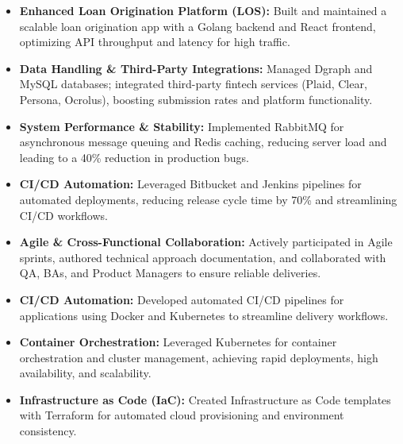 \begin{itemize}
  \item \textbf{Enhanced Loan Origination Platform (LOS):} Built and maintained a scalable loan origination app with a Golang backend and React frontend, optimizing API throughput and latency for high traffic.
  \item \textbf{Data Handling \& Third-Party Integrations:} Managed Dgraph and MySQL databases; integrated third-party fintech services (Plaid, Clear, Persona, Ocrolus), boosting submission rates and platform functionality.
  \item \textbf{System Performance \& Stability:} Implemented RabbitMQ for asynchronous message queuing and Redis caching, reducing server load and leading to a 40\% reduction in production bugs.
  \item \textbf{CI/CD Automation:} Leveraged Bitbucket and Jenkins pipelines for automated deployments, reducing release cycle time by 70\% and streamlining CI/CD workflows.
  \item \textbf{Agile \& Cross-Functional Collaboration:} Actively participated in Agile sprints, authored technical approach documentation, and collaborated with QA, BAs, and Product Managers to ensure reliable deliveries.
\end{itemize}

\newpage
{}
\begin{itemize}
  \item \textbf{CI/CD Automation:} Developed automated CI/CD pipelines for applications using Docker and Kubernetes to streamline delivery workflows.
  \item \textbf{Container Orchestration:} Leveraged Kubernetes for container orchestration and cluster management, achieving rapid deployments, high availability, and scalability.
  \item \textbf{Infrastructure as Code (IaC):} Created Infrastructure as Code templates with Terraform for automated cloud provisioning and environment consistency.
\end{itemize}
